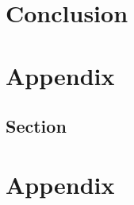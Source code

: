 \documentclass[
		11pt,
		a4paper,
		titlepage=firstiscover,
	]{scrreprt}
\renewcommand{\headrulewidth}{0.4pt}
\renewcommand{\chaptermark}[1]{\markboth{\thechapter\ #1}{}}
\renewcommand{\sectionmark}[1]{\markright{\thesection\ #1}}
\renewcommand{\headrulewidth}{0pt}
\begin{document}
    
    \chapter{Conclusion}
	

	
	
	
	\clearpage
	\newpage
	 \nocite{*} %
	
	\pagestyle{fancy}
	\fancyhead{}
	\fancyfoot{}
	\fancyhead[R]{\rightmark}
	\renewcommand{\headrulewidth}{0.4pt}
	\fancyfoot[R]{\thepage}
	\renewcommand{\chaptermark}[1]{\markboth{\thechapter\ #1}{}}
	\renewcommand{\sectionmark}[1]{\markright{\thesection\ #1}}
	
	\printbibliography[heading=bibintoc, title={Bibliography}]
	
	\newpage
	
	 \begin{appendices}
	 	\chapter{Appendix}
	 	\section{Section}
	 	\chapter{Appendix}
	\end{appendices}
	
	
\end{document}
